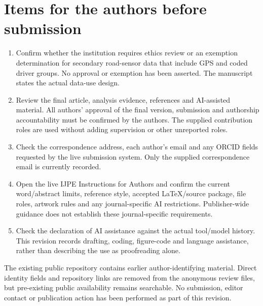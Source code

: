 \documentclass[11pt]{article}
\begin{document}
\section*{Items for the authors before submission}
\begin{enumerate}
\item Confirm whether the institution requires ethics review or an exemption determination for secondary road-sensor data that include GPS and coded driver groups. No approval or exemption has been asserted. The manuscript states the actual data-use design.
\item Review the final article, analysis evidence, references and AI-assisted material. All authors' approval of the final version, submission and authorship accountability must be confirmed by the authors. The supplied contribution roles are used without adding supervision or other unreported roles.
\item Check the correspondence address, each author's email and any ORCID fields requested by the live submission system. Only the supplied correspondence email is currently recorded.
\item Open the live IJPE Instructions for Authors and confirm the current word/abstract limits, reference style, accepted LaTeX/source package, file roles, artwork rules and any journal-specific AI restrictions. Publisher-wide guidance does not establish these journal-specific requirements.
\item Check the declaration of AI assistance against the actual tool/model history. This revision records drafting, coding, figure-code and language assistance, rather than describing the use as proofreading alone.
\end{enumerate}

The existing public repository contains earlier author-identifying material. Direct identity fields and repository links are removed from the anonymous review files, but pre-existing public availability remains searchable. No submission, editor contact or publication action has been performed as part of this revision.
\end{document}
